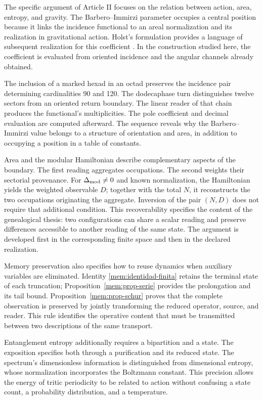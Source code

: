 The specific argument of Article II focuses on the relation between
action, area, entropy, and gravity. The Barbero--Immirzi parameter occupies
a central position because it links the incidence functional to an
areal normalization and its realization in gravitational action.
Holst's formulation provides a language of subsequent realization
for this coefficient \cite{holst1996}. In the construction studied here,
the coefficient is evaluated from oriented incidence and the angular
channels already obtained.

The inclusion of a marked hexad in an octad preserves the incidence
pair determining cardinalities 90 and 120. The dodecaphase turn
distinguishes twelve sectors from an oriented return boundary. The linear
reader of that chain produces the functional's multiplicities. The
pole coefficient and decimal evaluation are computed afterward.
The sequence reveals why the Barbero--Immirzi value belongs to a
structure of orientation and area, in addition to occupying a position in
a table of constants.

Area and the modular Hamiltonian describe complementary aspects
of the boundary. The first reading aggregates occupations. The second weights
their sectorial provenance. For \(\Delta_{\rm mod}\ne0\) and
known normalization, the Hamiltonian yields the weighted observable
\(D\); together with the total \(N\), it reconstructs the two
occupations originating the aggregate. Inversion of the pair
\((N,D)\) does not require that additional condition. This recoverability specifies
the content of the genealogical thesis: two configurations can
share a scalar reading and preserve differences accessible to another
reading of the same state. The argument is developed first in the
corresponding finite space and then in the declared realization.

Memory preservation also specifies how to reuse dynamics
when auxiliary variables are eliminated. Identity
\eqref{mem:identidad-finita} retains the terminal state of each truncation;
Proposition~\ref{mem:prop-serie} provides the prolongation and its tail
bound. Proposition~\ref{mem:prop-schur} proves that the complete
observation is preserved by jointly transforming the reduced operator,
source, and reader. This rule identifies the operative content that
must be transmitted between two descriptions of the same transport.

Entanglement entropy additionally requires a bipartition and a
state. The exposition specifies both through a purification and its
reduced state. The spectrum's dimensionless information is distinguished
from dimensional entropy, whose normalization incorporates the Boltzmann
constant. This precision allows the energy of tritic
periodicity to be related to action without confusing a state count,
a probability distribution, and a temperature.

